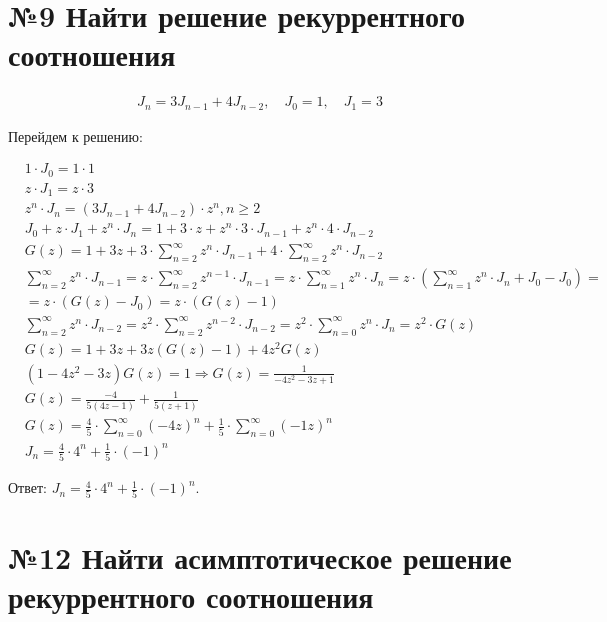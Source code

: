 \documentclass[a4paper,12pt,numbers=noenddot]{scrreprt}
\begin{document}
\section{№9  Найти решение рекуррентного соотношения}

\begin{align}
    J_n = 3J_{n-1}+4J_{n-2}, \quad J_0=1, \quad J_1 = 3
\end{align}

\begin{flushleft}
Перейдем к решению:
\end{flushleft}

\begin{align}
& 1 \cdot J_0 = 1 \cdot 1 \\&
z \cdot J_1 = z \cdot 3 \\&
z^n \cdot J_n = (3J_{n-1}+4J_{n-2}) \cdot z^n, n \geq 2\\&
J_0 + z \cdot J_1 + z^n \cdot J_n = 1 + 3 \cdot z + z^n \cdot 3 \cdot J_{n-1} + z^n \cdot 4 \cdot J_{n-2} \\&
G(z) = 1 + 3z + 3 \cdot \sum_{n=2}^{\infty} z^n \cdot J_{n-1} + 4  \cdot \sum_{n=2}^{\infty} z^n \cdot J_{n-2} \\&
\sum_{n=2}^{\infty} z^n \cdot J_{n-1} = z \cdot \sum_{n=2}^{\infty} z^{n-1} \cdot J_{n-1} = z \cdot \sum_{n=1}^{\infty} z^n \cdot J_n = z \cdot (\sum_{n=1}^{\infty} z^n \cdot J_n + J_0 - J_0) = \\&
 = z \cdot (G(z) - J_0) = z \cdot (G(z) - 1) \\&
\sum_{n=2}^{\infty} z^n \cdot J_{n-2} = z^2 \cdot \sum_{n=2}^{\infty} z^{n-2} \cdot J_{n-2} = z^2 \cdot \sum_{n=0}^{\infty} z^{n} \cdot J_{n} = z^2 \cdot G(z) \\&
G(z)= 1 + 3z + 3z(G(z)-1)+4z^2G(z) \\&
(1-4z^2-3z)G(z)=1 \Rightarrow G(z) = \frac{1}{-4z^2-3z+1} \\&
G(z) = \frac{-4}{5(4z-1)} + \frac{1}{5(z+1)} \\&
G(z)= \frac{4}{5} \cdot \sum_{n=0}^{\infty} (-4z)^n + \frac{1}{5} \cdot \sum_{n=0}^{\infty} (-1z)^n \\&
J_n=\frac{4}{5} \cdot 4^n + \frac{1}{5} \cdot (-1)^n
\end{align}

\begin{flushleft}
Ответ: $J_n=\frac{4}{5} \cdot 4^n + \frac{1}{5} \cdot (-1)^n$.
\end{flushleft}

\section{№12 Найти асимптотическое решение рекуррентного соотношения}
\end{document}
